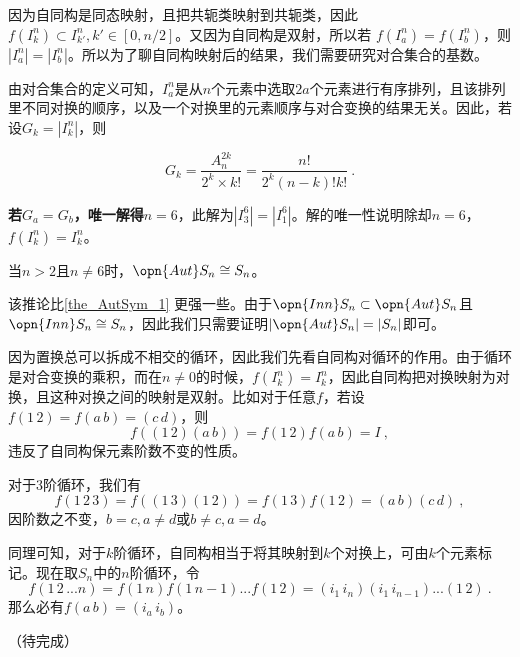 因为自同构是同态映射，且把共轭类映射到共轭类，因此$f(I_k^n)\subset I_{k'}^n,k'\in [0,n/2]$。又因为自同构是双射，所以若 $f(I_a^n)=f(I_b^n)$，则$|I_a^n|=|I_b^n|$。所以为了聊自同构映射后的结果，我们需要研究对合集合的基数。

由对合集合的定义可知，$I_a^n$是从$n$个元素中选取$2a$个元素进行有序排列，且该排列里不同对换的顺序，以及一个对换里的元素顺序与对合变换的结果无关。因此，若设$G_k=|I_k^n|$，则

\begin{equation}
G_k=\frac{A_{n}^{2k}}{2^k\times k!}=\frac{n!}{2^k(n-k)!k!}~.
\end{equation}

\textbf{若$G_a=G_b$，唯一解得$n=6$}，此解为$|I^6_3|=|I^6_1|$。解的唯一性说明除却$n=6$，$f(I_k^n)=I_k^n$。

\begin{corollary}{}
当$n>2$且$n\neq 6$时，$\opn{Aut}S_n\cong S_n$。
\end{corollary}
该推论比\autoref{the_AutSym_1} 更强一些。由于$\opn{Inn}S_n\subset \opn{Aut} S_n$且$\opn{Inn}S_n\cong S_n$，因此我们只需要证明$|\opn{Aut}S_n|=|S_n|$即可。

因为置换总可以拆成不相交的循环，因此我们先看自同构对循环的作用。由于循环是对合变换的乘积，而在$n\neq 0$的时候，$f(I_k^n)=I_k^n$，因此自同构把对换映射为对换，且这种对换之间的映射是双射。比如对于任意$f$，若设$f(1\,2)=f(a\,b)=(c\,d)$，则
\begin{equation}
f((1\,2)(a\,b))=f(1\,2)f(a\,b)=I~,
\end{equation}
违反了自同构保元素阶数不变的性质。

对于3阶循环，我们有
\begin{equation}
f(1\,2\,3)=f((1\,3)(1\,2))=f(1\,3)f(1\,2)=(a\,b)(c\,d)~,
\end{equation}
因阶数之不变，$b=c,a\neq d$或$b\neq c,a=d$。

同理可知，对于$k$阶循环，自同构相当于将其映射到$k$个对换上，可由$k$个元素标记。现在取$S_n$中的$n$阶循环，令
\begin{equation}
f(1\,2\,...n)=f(1\,n)f(1\,n-1)...f(1\,2)=(i_1\,i_n)(i_1\,i_{n-1})...(1\,2)~.
\end{equation}
那么必有$f(a\,b)=(i_a\,i_b)$。

（待完成）
